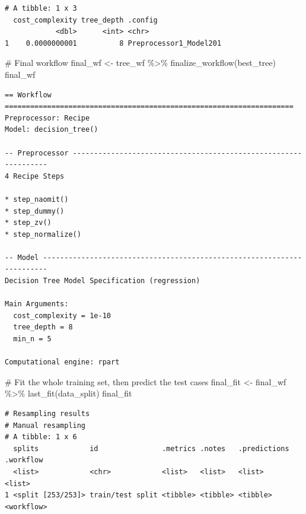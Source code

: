 \documentclass[
]{article}
\newenvironment{Shaded}{\begin{snugshade}}{\end{snugshade}}
\newcommand{\CommentTok}[1]{\textcolor[rgb]{0.37,0.37,0.37}{#1}}
\newcommand{\FunctionTok}[1]{\textcolor[rgb]{0.28,0.35,0.67}{#1}}
\newcommand{\NormalTok}[1]{\textcolor[rgb]{0.00,0.23,0.31}{#1}}
\newcommand{\OtherTok}[1]{\textcolor[rgb]{0.00,0.23,0.31}{#1}}
\newcommand{\SpecialCharTok}[1]{\textcolor[rgb]{0.37,0.37,0.37}{#1}}
\begin{document}
\begin{verbatim}
# A tibble: 1 x 3
  cost_complexity tree_depth .config               
            <dbl>      <int> <chr>                 
1    0.0000000001          8 Preprocessor1_Model201
\end{verbatim}

\begin{Shaded}
\begin{Highlighting}[]
\CommentTok{\# Final workflow}
\NormalTok{final\_wf }\OtherTok{\textless{}{-}}\NormalTok{ tree\_wf }\SpecialCharTok{\%\textgreater{}\%}
  \FunctionTok{finalize\_workflow}\NormalTok{(best\_tree)}
\NormalTok{final\_wf}
\end{Highlighting}
\end{Shaded}

\begin{verbatim}
== Workflow ====================================================================
Preprocessor: Recipe
Model: decision_tree()

-- Preprocessor ----------------------------------------------------------------
4 Recipe Steps

* step_naomit()
* step_dummy()
* step_zv()
* step_normalize()

-- Model -----------------------------------------------------------------------
Decision Tree Model Specification (regression)

Main Arguments:
  cost_complexity = 1e-10
  tree_depth = 8
  min_n = 5

Computational engine: rpart 
\end{verbatim}

\begin{Shaded}
\begin{Highlighting}[]
\CommentTok{\# Fit the whole training set, then predict the test cases}
\NormalTok{final\_fit }\OtherTok{\textless{}{-}} 
\NormalTok{  final\_wf }\SpecialCharTok{\%\textgreater{}\%}
  \FunctionTok{last\_fit}\NormalTok{(data\_split)}
\NormalTok{final\_fit}
\end{Highlighting}
\end{Shaded}

\begin{verbatim}
# Resampling results
# Manual resampling 
# A tibble: 1 x 6
  splits            id               .metrics .notes   .predictions .workflow 
  <list>            <chr>            <list>   <list>   <list>       <list>    
1 <split [253/253]> train/test split <tibble> <tibble> <tibble>     <workflow>
\end{verbatim}
\end{document}
